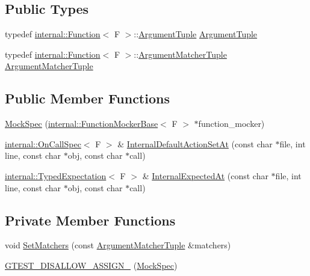 \subsection*{Public Types}
\begin{DoxyCompactItemize}
\item 
typedef \hyperlink{structtesting_1_1internal_1_1Function}{internal\+::\+Function}$<$ F $>$\+::\hyperlink{classtesting_1_1internal_1_1MockSpec_a7d520daca5d4d937578b4c7e8f0cf43e}{Argument\+Tuple} \hyperlink{classtesting_1_1internal_1_1MockSpec_a7d520daca5d4d937578b4c7e8f0cf43e}{Argument\+Tuple}
\item 
typedef \hyperlink{structtesting_1_1internal_1_1Function}{internal\+::\+Function}$<$ F $>$\+::\hyperlink{classtesting_1_1internal_1_1MockSpec_a35dc5836483cb8c6882c365c447b26cd}{Argument\+Matcher\+Tuple} \hyperlink{classtesting_1_1internal_1_1MockSpec_a35dc5836483cb8c6882c365c447b26cd}{Argument\+Matcher\+Tuple}
\end{DoxyCompactItemize}
\subsection*{Public Member Functions}
\begin{DoxyCompactItemize}
\item 
\hyperlink{classtesting_1_1internal_1_1MockSpec_a067fe3d12433cec0aa63f396f4f55fa9}{Mock\+Spec} (\hyperlink{classtesting_1_1internal_1_1FunctionMockerBase}{internal\+::\+Function\+Mocker\+Base}$<$ F $>$ $\ast$function\+\_\+mocker)
\item 
\hyperlink{classtesting_1_1internal_1_1OnCallSpec}{internal\+::\+On\+Call\+Spec}$<$ F $>$ \& \hyperlink{classtesting_1_1internal_1_1MockSpec_a875c99443da1265604d87429693457f4}{Internal\+Default\+Action\+Set\+At} (const char $\ast$file, int line, const char $\ast$obj, const char $\ast$call)
\item 
\hyperlink{classtesting_1_1internal_1_1TypedExpectation}{internal\+::\+Typed\+Expectation}$<$ F $>$ \& \hyperlink{classtesting_1_1internal_1_1MockSpec_a503a434637634014b9bb6c5d68fd336c}{Internal\+Expected\+At} (const char $\ast$file, int line, const char $\ast$obj, const char $\ast$call)
\end{DoxyCompactItemize}
\subsection*{Private Member Functions}
\begin{DoxyCompactItemize}
\item 
void \hyperlink{classtesting_1_1internal_1_1MockSpec_a6b4fd303136c6282b19ddb16100f02a2}{Set\+Matchers} (const \hyperlink{classtesting_1_1internal_1_1MockSpec_a35dc5836483cb8c6882c365c447b26cd}{Argument\+Matcher\+Tuple} \&matchers)
\item 
\hyperlink{classtesting_1_1internal_1_1MockSpec_acab7269f80d53da2aef9d94c5febe6c5}{G\+T\+E\+S\+T\+\_\+\+D\+I\+S\+A\+L\+L\+O\+W\+\_\+\+A\+S\+S\+I\+G\+N\+\_\+} (\hyperlink{classtesting_1_1internal_1_1MockSpec}{Mock\+Spec})
\end{DoxyCompactItemize}

